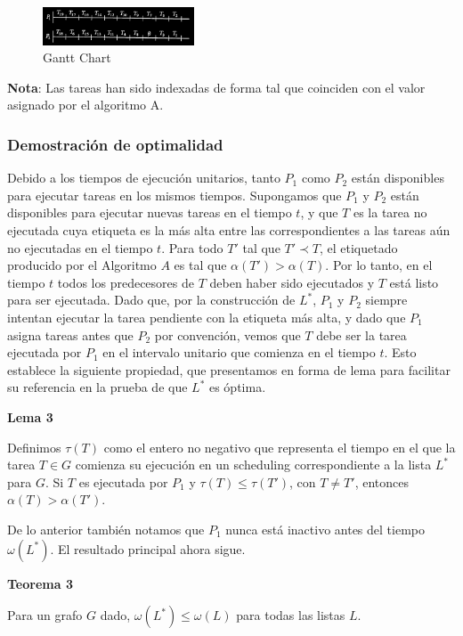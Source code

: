 \documentclass[14pt]{extarticle}
\begin{document}
\begin{figure}[h]
    \centering
    \includegraphics[width=0.4\textwidth]{images/gantt_chart.png}
    \caption{Gantt Chart}
\end{figure}

\textbf{Nota}: Las tareas han sido indexadas de forma tal que coinciden con el valor asignado por el algoritmo A.

\subsubsection*{Demostración de optimalidad}

Debido a los tiempos de ejecución unitarios, tanto $P_1$ como $P_2$ están disponibles para ejecutar tareas en los mismos tiempos. Supongamos que $P_1$ y $P_2$ están disponibles para ejecutar nuevas tareas en el tiempo $t$, y que $T$ es la tarea no ejecutada cuya etiqueta es la más alta entre las correspondientes a las tareas aún no ejecutadas en el tiempo $t$. Para todo $T'$ tal que $T' \prec T$, el etiquetado producido por el Algoritmo $A$ es tal que $\alpha(T') > \alpha(T)$. Por lo tanto, en el tiempo $t$ todos los predecesores de $T$ deben haber sido ejecutados y $T$ está listo para ser ejecutada. Dado que, por la construcción de $L^*$, $P_1$ y $P_2$ siempre intentan ejecutar la tarea pendiente con la etiqueta más alta, y dado que $P_1$ asigna tareas antes que $P_2$ por convención, vemos que $T$ debe ser la tarea ejecutada por $P_1$ en el intervalo unitario que comienza en el tiempo $t$. Esto establece la siguiente propiedad, que presentamos en forma de lema para facilitar su referencia en la prueba de que $L^*$ es óptima.

\textbf{Lema 3}

Definimos $\tau(T)$ como el entero no negativo que representa el tiempo en el que la tarea $T \in G$ comienza su ejecución en un scheduling correspondiente a la lista $L^*$ para $G$. Si $T$ es ejecutada por $P_1$ y $\tau(T) \leq \tau(T')$, con $T \neq T'$, entonces $\alpha(T) > \alpha(T')$.

De lo anterior también notamos que $P_1$ nunca está inactivo antes del tiempo $\omega(L^*)$. El resultado principal ahora sigue.

\textbf{Teorema 3}

Para un grafo $G$ dado, $\omega(L^*) \leq \omega(L)$ para todas las listas $L$.
\end{document}
